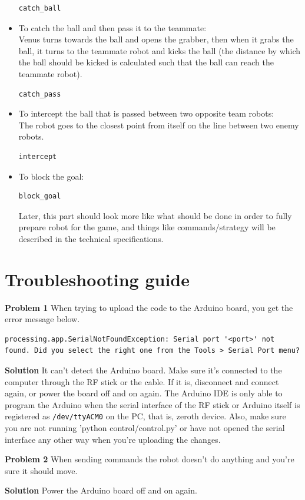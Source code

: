 \documentclass[12pt]{article}
\begin{document}
\begin{itemize}
\begin{lstlisting}
catch_ball
\end{lstlisting}
\newpage

\item To catch the ball and then pass it to the teammate:
\\Venus turns towards the ball and opens the grabber, then when it grabs the ball, it turns to the teammate robot and kicks the ball (the distance by which the ball should be kicked is calculated such that the ball can reach the teammate robot).
\begin{lstlisting}
catch_pass
\end{lstlisting}

\item To intercept the ball that is passed between two opposite team robots:
\\The robot goes to the closest point from itself on the line between two enemy robots.
\begin{lstlisting}
intercept
\end{lstlisting}

\item To block the goal:
\begin{lstlisting}
block_goal
\end{lstlisting}

Later, this part should look more like what should be done in order to fully prepare robot for the game, and things like commands/strategy will be described in the technical specifications.

\end{itemize}

\section{Troubleshooting guide}
\textbf{Problem 1} When trying to upload the code to the Arduino board, you get the error message below.
\begin{lstlisting}
processing.app.SerialNotFoundException: Serial port '<port>' not found. Did you select the right one from the Tools > Serial Port menu?
\end{lstlisting}

\bigskip

\textbf{Solution}  It can't detect the Arduino board. Make sure it's connected to the computer through the RF stick or the cable. If it is, disconnect and connect again, or power the board off and on again. The Arduino IDE is only able to program the Arduino when the serial interface of the RF stick or Arduino itself is registered as \texttt{/dev/ttyACM0} on the PC, that is, zeroth device. Also, make sure you are not running 'python control/control.py' or have not opened the serial interface any other way when you're uploading the changes.
\bigskip

\textbf{Problem 2} When sending commands the robot doesn't do anything and you're sure it should move.
\bigskip

\textbf{Solution} Power the Arduino board off and on again.
\end{document}
